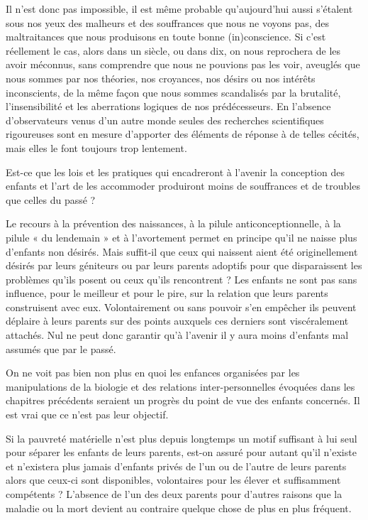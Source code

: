  Il n'est donc pas impossible, il est même probable qu'aujourd'hui aussi s'étalent sous nos yeux des malheurs et des souffrances que nous ne voyons pas, des maltraitances que nous produisons en toute bonne (in)conscience. Si c'est réellement le cas, alors dans un siècle, ou dans dix, on nous reprochera de les avoir méconnus, sans comprendre que nous ne pouvions pas les voir, aveuglés que nous sommes par nos théories, nos croyances, nos désirs ou nos intérêts inconscients, de la même façon que nous sommes scandalisés par la brutalité, l'insensibilité et les aberrations logiques de nos prédécesseurs. 
 En l'absence d'observateurs venus d'un autre monde seules des recherches scientifiques rigoureuses sont en mesure d'apporter des éléments de réponse à de telles cécités, mais elles le font toujours trop lentement.
 
 Est-ce que les lois et les pratiques qui encadreront à l'avenir la conception des enfants et l'art de les accommoder produiront moins de souffrances et de troubles que celles du passé ? 
 
 Le recours à la prévention des naissances, à la pilule anticonceptionnelle, à la pilule « du lendemain » et à l'avortement permet en principe qu'il ne naisse plus d'enfants non désirés. Mais suffit-il que ceux qui naissent aient été originellement désirés par leurs géniteurs ou par leurs parents adoptifs pour que disparaissent les problèmes qu'ils posent ou ceux qu'ils rencontrent ? Les enfants ne sont pas sans influence, pour le meilleur et pour le pire, sur la relation que leurs parents construisent avec eux. Volontairement ou sans pouvoir s'en empêcher ils peuvent déplaire à leurs parents sur des points auxquels ces derniers sont viscéralement attachés. Nul ne peut donc garantir qu'à l'avenir il y aura moins d'enfants mal assumés que par le passé. 
 
On ne voit pas bien non plus en quoi les enfances organisées par les manipulations de la biologie et des relations inter-personnelles évoquées dans les chapitres précédents seraient un progrès du point de vue des enfants concernés. Il est vrai que ce n'est pas leur objectif. 
 
 
 Si la pauvreté matérielle n'est plus depuis longtemps un motif suffisant à lui seul pour séparer les enfants de leurs parents, est-on assuré pour autant qu'il n'existe et n'existera plus jamais d'enfants privés de l'un ou de l'autre de leurs parents alors que ceux-ci sont disponibles, volontaires pour les élever et suffisamment compétents ? L'absence de l'un des deux parents pour d'autres raisons que la maladie ou la mort devient au contraire quelque chose de plus en plus fréquent. 
 
